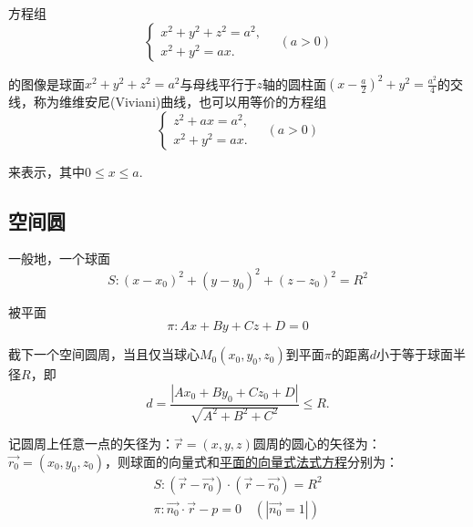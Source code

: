 方程组
\begin{equation*}
\begin{cases}
x^2+y^2+z^2=a^2,\\
x^2+y^2=ax.
\end{cases}
\quad (a>0)
\end{equation*}
\par 的图像是球面$x^2+y^2+z^2=a^2$与母线平行于$z$轴的圆柱面$\displaystyle (x-\frac{a}{2})^2+y^2=\frac{a^2}{4}$的交线，称为{\color{dy}维维安尼(Viviani)曲线}，也可以用等价的方程组
\begin{equation*}
\begin{cases}
z^2+ax=a^2,\\
x^2+y^2=ax.
\end{cases}
\quad (a>0)
\end{equation*}
\par 来表示，其中$0 \le x \le a$.
\jg
\subsection{空间圆}
\tdefination[空间圆周]
一般地，一个球面
$$
S:(x-x_0)^2+(y-y_0)^2+(z-z_0)^2=R^2
$$
\par 被平面
$$\pi:Ax+By+Cz+D=0$$
\par 截下一个{\color{dy}空间圆周}，当且仅当球心$M_0(x_0,y_0,z_0)$到平面$\pi $的距离$d$小于等于球面半径$R$，即
\begin{equation}
d=\frac{|Ax_0+By_0+Cz_0+D|}{\sqrt{A^2+B^2+C^2}} \le R.
\end{equation}

\theorem[空间圆的圆心和半径]
记圆周上任意一点的矢径为：$\overrightarrow{r}=(x,y,z)$圆周的圆心的矢径为：$\overrightarrow{r_0}=(x_0,y_0,z_0)$，则球面的向量式和\hyperref[平面的向量式法式方程]{\color{超链接}平面的向量式法式方程}分别为：
\begin{equation*}
\begin{array}{l}
S:(\overrightarrow{r}-\overrightarrow{r_0})\cdot (\overrightarrow{r}-\overrightarrow{r_0})=R^2\\
\pi : \overrightarrow{n_0} \cdot \overrightarrow{r}-p=0\quad (|\overrightarrow{n_0}=1|)
\end{array}
\end{equation*}

